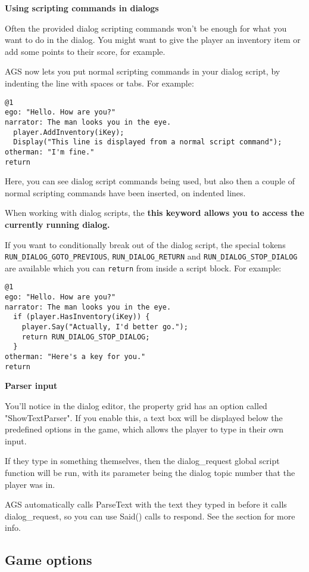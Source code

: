 \bf{Using scripting commands in dialogs}

Often the provided dialog scripting commands won't be enough for what you want
to do in the dialog. You might want to give the player an inventory item or
add some points to their score, for example.

AGS now lets you put normal scripting commands in your dialog script, by indenting
the line with spaces or tabs. For example:
\begin{verbatim}
@1
ego: "Hello. How are you?"
narrator: The man looks you in the eye.
  player.AddInventory(iKey);
  Display("This line is displayed from a normal script command");
otherman: "I'm fine."
return
\end{verbatim}
Here, you can see dialog script commands being used, but also then a
couple of normal scripting commands have been inserted, on indented lines.

When working with dialog scripts, the \bf{this} keyword allows you to access
the currently running dialog.

If you want to conditionally break out of the dialog
script, the special tokens \verb$RUN_DIALOG_GOTO_PREVIOUS$, \verb$RUN_DIALOG_RETURN$
and \verb$RUN_DIALOG_STOP_DIALOG$ are available which you can \verb$return$ from inside
a script block. For example:

\begin{verbatim}
@1
ego: "Hello. How are you?"
narrator: The man looks you in the eye.
  if (player.HasInventory(iKey)) {
    player.Say("Actually, I'd better go.");
    return RUN_DIALOG_STOP_DIALOG;
  }
otherman: "Here's a key for you."
return
\end{verbatim}

\bf{Parser input}

You'll notice in the dialog editor, the property grid has an option called "ShowTextParser".
If you enable this, a text box will be displayed below the predefined options in the game,
which allows the player to type in their own input.

If they type in something themselves, then the dialog_request global script function
will be run, with its parameter being the dialog topic number that the player was in.

AGS automatically calls ParseText with the text they typed in before it calls dialog_request,
so you can use Said() calls to respond. See the  section
for more info.

\subsection{Game options}%

